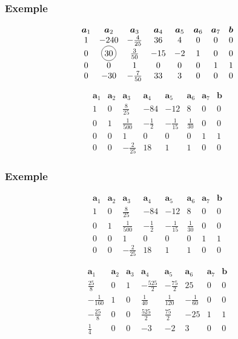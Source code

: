 \documentclass[usepdftitle=false]{beamer}
\newcommand*\circled[1]{\tikz[baseline=(char.base)]{
		\node[shape=circle,draw,inner sep=2pt] (char) {#1};}}
\def\ba{\boldsymbol{a}}
\def\bb{\boldsymbol{b}}
\begin{document}
\begin{frame}
\frametitle{Exemple}

\[
\begin{matrix}
\ba_1 & \ba_2 & \ba_3 & \ba_4 & \ba_5 &\ba_6 &\ba_7 & \bb \\
1 & -240 & -\frac{4}{25} & 36 & 4 & 0 & 0 & 0 \\
0 & \circled{30} & \frac{3}{50} & -15 & -2 & 1 & 0 & 0 \\
0 & 0 & 1 & 0 & 0 & 0 & 1 & 1 \\
0 & -30 & -\frac{7}{50} & 33 & 3 & 0 & 0 & 0
\end{matrix}
\]

\[
\begin{matrix}
\ba_1 & \ba_2 & \ba_3 & \ba_4 & \ba_5 &\ba_6 &\ba_7 & \bb \\
1 & 0 & \frac{8}{25} & -84 & -12 & 8 & 0 & 0 \\
0 & 1 & \frac{1}{500} & -\frac{1}{2} & -\frac{1}{15} & \frac{1}{30} & 0 & 0 \\
0 & 0 & 1 & 0 & 0 & 0 & 1 & 1 \\
0 & 0 & -\frac{2}{25} & 18 & 1 & 1 & 0 & 0
\end{matrix}
\]

\end{frame}

\begin{frame}
\frametitle{Exemple}

\[
\begin{matrix}
\ba_1 & \ba_2 & \ba_3 & \ba_4 & \ba_5 &\ba_6 &\ba_7 & \bb \\
1 & 0 & \frac{8}{25} & -84 & -12 & 8 & 0 & 0 \\
0 & 1 & \frac{1}{500} & -\frac{1}{2} & -\frac{1}{15} & \frac{1}{30} & 0 & 0 \\
0 & 0 & 1 & 0 & 0 & 0 & 1 & 1 \\
0 & 0 & -\frac{2}{25} & 18 & 1 & 1 & 0 & 0
\end{matrix}
\]

\[
\begin{matrix}
\ba_1 & \ba_2 & \ba_3 & \ba_4 & \ba_5 &\ba_6 &\ba_7 & \bb \\
\frac{25}{8} & 0 & 1 & -\frac{525}{2} & -\frac{75}{2} & 25 & 0 & 0 \\
-\frac{1}{160} & 1 & 0 & \frac{1}{40} & \frac{1}{120} & -\frac{1}{60} & 0 & 0 \\
-\frac{25}{8} & 0 & 0 & \frac{525}{2} & \frac{75}{2} & -25 & 1 & 1 \\
\frac{1}{4} & 0 & 0 & -3 & -2 & 3 & 0 & 0
\end{matrix}
\]

\end{frame}
\end{document}
